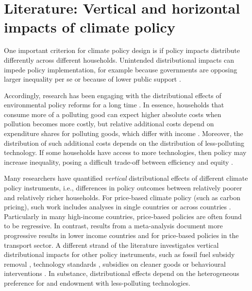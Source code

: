 \documentclass[12pt, a4paper]{article}
\begin{document}
\section{Literature: Vertical and horizontal impacts of climate policy} \label{sec:literature}

One important criterion for climate policy design is if policy impacts distribute differently across different households. Unintended distributional impacts can impede policy implementation, for example because governments are opposing larger inequality per se or because of lower public support \autocite{Bergquist.2022,Douenne.2022}. 

Accordingly, research has been engaging with the distributional effects of environmental policy reforms for a long time \autocite{Cremer.2003,Poterba.1991,Sandmo.1975}. In essence, households that consume more of a polluting good can expect higher absolute costs when pollution becomes more costly, but relative additional costs depend on expenditure shares for polluting goods, which differ with income \autocite{Jacobs.2019,Dorband.2019}. Moreover, the distribution of such additional costs depends on the distribution of less-polluting technology. If some households have access to more technologies, then policy may increase inequality, posing a difficult trade-off between efficiency and equity \autocite{Hansel.2022}. 

Many researchers have quantified \textit{vertical} distributional effects of different climate policy instruments, i.e., differences in policy outcomes between relatively poorer and relatively richer households. For price-based climate policy (such as carbon pricing), such work includes analyses in single countries \autocite{Goulder.2019,Grainger.2010,Rausch.2011,Garaffa.2021,Sterner.2012,Wu.2022} or across countries \autocite{Budolfson.2021,Feindt.2021,Dorband.2019,Steckel.2021b,VogtSchilb.2019,Missbach.2024}. Particularly in many high-income countries, price-based policies are often found to be regressive. In contrast, results from a meta-analysis \autocite{Ohlendorf.2021} document more progressive results in lower income countries and for price-based policies in the transport sector.
A different strand of the literature investigates vertical distributional impacts for other policy instruments, such as fossil fuel subsidy removal \autocite{Schaffitzel.2019,Giuliano.2020}, technology standards \autocite{Levinson.2019,Zhao.2022,Bruegge.2019}, subsidies on cleaner goods \autocite{Borenstein.2016,Vaishnav.2017} or behavioural interventions \autocite{DellaValle.2020,Liebe.2021}. In substance, distributional effects depend on the heterogeneous preference for and endowment with less-polluting technologies. 
\end{document}
